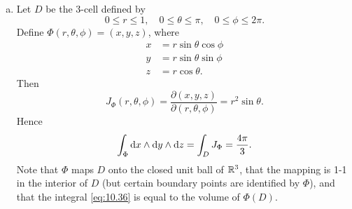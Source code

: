 \begin{newexample}
\begin{enumerate}[(a)]
        \item Let $D$ be the 3-cell defined by
              \begin{equation*}
                  0 \leq r \leq 1,
                  \quad
                  0 \leq \theta \leq \pi,
                  \quad
                  0 \leq \phi \leq 2\pi.
              \end{equation*}
              Define $\Phi(r,\theta,\phi)=(x,y,z)$, where
              \begin{align*}
                  x & = r \sin \theta \cos \phi \\
                  y & = r \sin \theta \sin \phi \\
                  z & = r \cos \theta.
              \end{align*}
              Then
              \begin{equation*}
                  J_{\Phi}(r,\theta,\phi) =
                  \frac{\partial(x,y,z)}{\partial(r,\theta,\phi)} =
                  r^2 \sin \theta.
              \end{equation*}
              Hence
              \begin{equation}
                  \label{eq:10.36}
                  \int_{\Phi} \d x \wedge \d y \wedge \d z =
                  \int_{D} J_{\Phi} = \frac{4\pi}{3} .
              \end{equation}
              Note that $\Phi$ maps $D$ onto the closed unit ball of ${\protect\mathbb R}^3$, that the mapping is 1-1 in the interior of $D$ (but certain boundary points are identified by $\Phi$), and that the integral \eqref{eq:10.36} is equal to the volume of $\Phi(D)$.
    \end{enumerate}
\end{newexample}

